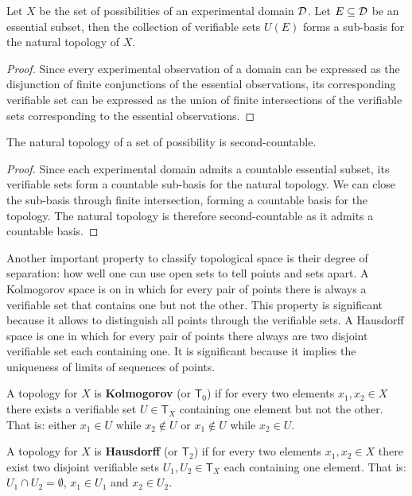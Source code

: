 \documentclass[11pt,letterpaper,fleqn]{memoir} %
\begin{document}
\begin{mathSection}
	\begin{prop}
		Let $X$ be the set of possibilities of an experimental domain $\mathcal{D}$. Let $E \subseteq \mathcal{D}$ be an essential subset, then the collection of verifiable sets $U(E)$ forms a sub-basis for the natural topology of $X$.
	\end{prop}
	\begin{proof}
		Since every experimental observation of a domain can be expressed as the disjunction of finite conjunctions of the essential observations, its corresponding verifiable set can be expressed as the union of finite intersections of the verifiable sets corresponding to the essential observations.
	\end{proof}
	\begin{prop}
		The natural topology of a set of possibility is second-countable.
	\end{prop}
	\begin{proof}
		Since each experimental domain admits a countable essential subset, its verifiable sets form a countable sub-basis for the natural topology. We can close the sub-basis through finite intersection, forming a countable basis for the topology. The natural topology is therefore second-countable as it admits a countable basis.
\end{proof}
\end{mathSection}

Another important property to classify topological space is their degree of separation: how well one can use open sets to tell points and sets apart. A Kolmogorov space is on in which for every pair of points there is always a verifiable set that contains one but not the other. This property is significant because it allows to distinguish all points through the verifiable sets. A Hausdorff space is one in which for every pair of points there always are two disjoint verifiable set each containing one. It is significant because it implies the uniqueness of limits of sequences of points.

\begin{mathSection}
	\begin{defn}
		A topology for $X$ is \textbf{Kolmogorov} (or $\mathsf{T}_0$) if for every two elements $x_1, x_2 \in X$ there exists a verifiable set $U \in \mathsf{T}_X$ containing one element but not the other. That is: either $x_1 \in U$ while $x_2 \notin U$ or $x_1 \notin U$ while $x_2 \in U$.
	\end{defn}
	\begin{defn}
	A topology for $X$ is \textbf{Hausdorff} (or $\mathsf{T}_2$) if for every two elements $x_1, x_2 \in X$ there exist two disjoint verifiable sets $U_1, U_2 \in \mathsf{T}_X$ each containing one element. That is: $U_1 \cap U_2 = \emptyset$, $x_1 
	\in U_1$ and $x_2 \in U_2$.
\end{defn}

\end{mathSection}
\end{document}
